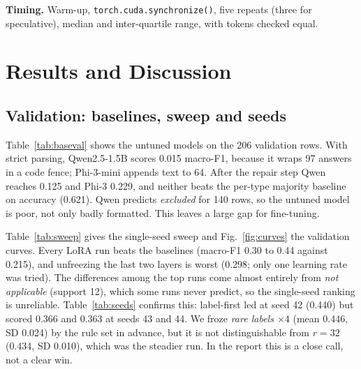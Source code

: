 \documentclass[conference]{IEEEtran}
\begin{document}
\textbf{Timing.} Warm-up, \texttt{torch.cuda.synchronize()}, five repeats (three for speculative), median and inter-quartile range, with tokens checked equal.

\section{Results and Discussion}

\subsection{Validation: baselines, sweep and seeds}
Table~\ref{tab:baseval} shows the untuned models on the 206 validation rows. With strict parsing, Qwen2.5-1.5B scores 0.015 macro-F1, because it wraps 97 answers in a code fence; Phi-3-mini appends text to 64. After the repair step Qwen reaches 0.125 and Phi-3 0.229, and neither beats the per-type majority baseline on accuracy (0.621). Qwen predicts \emph{excluded} for 140 rows, so the untuned model is poor, not only badly formatted. This leaves a large gap for fine-tuning.

\begin{table}[t]
\centering\small
\caption{Validation, untuned models and the majority baseline (greedy, fp16, 206 rows).}
\label{tab:baseval}
\resizebox{\columnwidth}{!}{}
\end{table}

Table~\ref{tab:sweep} gives the single-seed sweep and Fig.~\ref{fig:curves} the validation curves. Every LoRA run beats the baselines (macro-F1 0.30 to 0.44 against 0.215), and unfreezing the last two layers is worst (0.298; only one learning rate was tried). The differences among the top runs come almost entirely from \emph{not applicable} (support 12), which some runs never predict, so the single-seed ranking is unreliable. Table~\ref{tab:seeds} confirms this: label-first led at seed 42 (0.440) but scored 0.366 and 0.363 at seeds 43 and 44. We froze \emph{rare labels $\times4$} (mean 0.446, SD 0.024) by the rule set in advance, but it is not distinguishable from $r=32$ (0.434, SD 0.010), which was the steadier run. In the report this is a close call, not a clear win.

\begin{table}[t]
\centering\small
\caption{Validation sweep, seed 42, best epoch by macro-F1.}
\label{tab:sweep}
\resizebox{\columnwidth}{!}{}
\end{table}
\end{document}
